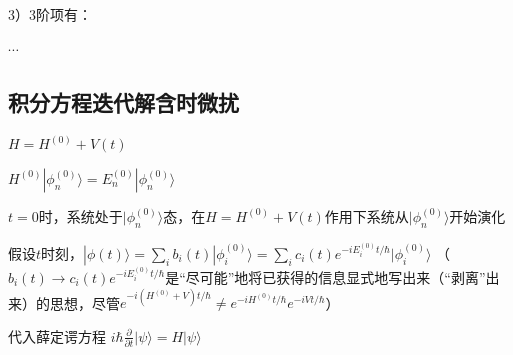 \medskip

3）3阶项有：

$\cdots$



\subsection{积分方程迭代解含时微扰}

$H=H^{(0)}+V(t)$

$H^{(0)}|\phi^{(0)}_n\rangle=E^{(0)}_n|\phi^{(0)}_n\rangle$

$t=0$时，系统处于$|\phi^{(0)}_n\rangle$态，在$H=H^{(0)}+V(t)$作用下系统从$|\phi^{(0)}_n\rangle$开始演化

\bigskip

假设$t$时刻，$|\phi(t)\rangle=\sum_{i} b_i(t) |\phi^{(0)}_i\rangle=\sum_{i} c_i(t) e^{-iE^{(0)}_i t/\hbar} |\phi^{(0)}_i\rangle$
（$b_i(t)\rightarrow c_i(t) e^{-iE^{(0)}_i t/\hbar}$是“尽可能”地将已获得的信息显式地写出来（“剥离”出来）的思想，尽管$e^{-i(H^{(0)}+V)t/\hbar} \neq e^{-iH^{(0)} t/\hbar}e^{-iV t/\hbar}$）

代入薛定谔方程
$i\hbar \frac{\partial}{\partial t}|\psi\rangle = H|\psi\rangle$

